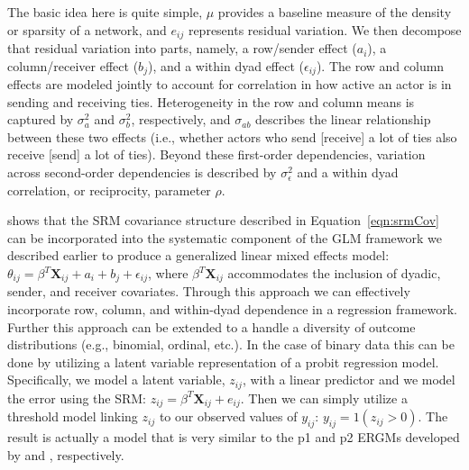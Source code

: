 The basic idea here is quite simple, $\mu$ provides a baseline measure of the density or sparsity of a network, and $e_{ij}$ represents residual variation. We then decompose that residual variation into parts, namely, a row/sender effect ($a_{i}$), a column/receiver effect ($b_{j}$), and a within dyad effect ($\epsilon_{ij}$). The row and column effects are modeled jointly to account for correlation in how active an actor is in sending and receiving ties. Heterogeneity in the row and column means is captured by $\sigma_{a}^{2}$ and $\sigma_{b}^{2}$, respectively, and $\sigma_{ab}$ describes the linear relationship between these two effects (i.e., whether actors who send [receive] a lot of ties also receive [send] a lot of ties). Beyond these first-order dependencies, variation across second-order dependencies is described by $\sigma_{\epsilon}^{2}$ and a within dyad correlation, or reciprocity, parameter $\rho$. 

\citet{hoff:2005} shows that the SRM covariance structure described in Equation~\ref{eqn:srmCov} can be incorporated into the systematic component of the GLM framework we described earlier to produce a generalized linear mixed effects model: $\theta_{ij} = \beta^{T} \mathbf{X}_{ij} + a_{i} + b_{j} + \epsilon_{ij}$, where $ \beta^{T} \mathbf{X}_{ij}$ accommodates the inclusion of dyadic, sender, and receiver covariates. Through this approach we can effectively incorporate row, column, and within-dyad dependence in a regression framework. Further this approach can be extended to a handle a diversity of outcome distributions (e.g., binomial, ordinal, etc.). In the case of binary data this can be done by utilizing a latent variable representation of a probit regression model. Specifically, we model a latent variable, $z_{ij}$, with a linear predictor and we model the error using the SRM: $z_{ij} = \beta^{T} \mathbf{X}_{ij} + e_{ij}$. Then we can simply utilize a threshold model linking $z_{ij}$ to our observed values of $y_{ij}$: $y_{ij} = 1(z_{ij}>0)$. The result is actually a model that is very similar to the p1 and p2 ERGMs developed by \citet{holland:leinhardt1981} and \citet{duijn:etal:2004}, respectively. 


